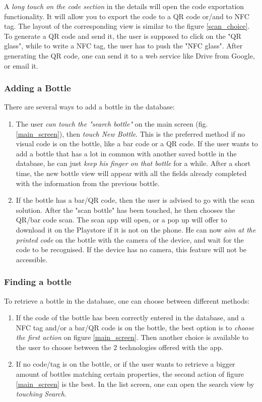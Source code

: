 A \emph{long touch on the code section} in the details will open the code exportation functionality. It will allow you to export the code to a QR code or/and to NFC tag. The layout of the corresponding view is similar to the figure \ref{scan_choice}. To generate a QR code and send it, the user is supposed to click on the "QR glass", while to write a NFC tag, the user has to push the "NFC glass". After generating the QR code, one can send it to a web service like Drive from Google, or email it.

\subsubsection{Adding a Bottle}

There are several ways to add a bottle in the database:

\begin{enumerate}
\item The user \emph{can touch the "search bottle"} on the main screen (fig. \ref{main_screen}), then \emph{touch New Bottle}. This is the preferred method if no visual code is on the bottle, like a bar code or a QR code. If the user wants to add a bottle that has a lot in common with another saved bottle in the database, he can just \emph{keep his finger on that bottle} for a while. After a short time, the new bottle view will appear with all the fields already completed with the information from the previous bottle.

\item If the bottle has a bar/QR code, then the user is advised to go with the scan solution. After the "scan bottle" has been touched, he then chooses the QR/bar code scan. The scan app will open, or a pop up will offer to download it on the Playstore if it is not on the phone. He can now \emph{aim at the printed code} on the bottle with the camera of the device, and wait for the code to be recognised. If the device has no camera, this feature will not be accessible.
\end{enumerate}

\subsubsection{Finding a bottle}

To retrieve a bottle in the database, one can choose between different methods:

\begin{enumerate}
\item If the code of the bottle has been correctly entered in the database, and a NFC tag and/or a bar/QR code is on the bottle, the best option is to \emph{choose the first action} on figure \ref{main_screen}. Then another choice is available to the user to choose between the 2 technologies offered with the app.

\item If no code/tag is on the bottle, or if the user wants to retrieve a bigger amount of bottles matching certain properties, the second action of figure \ref{main_screen} is the best. In the list screen, one can open the search view by \emph{touching Search}.
\end{enumerate}

